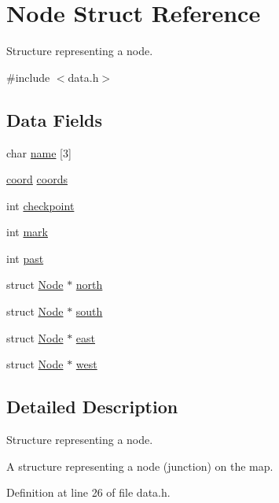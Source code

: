 \hypertarget{struct_node}{\section{Node Struct Reference}
\label{struct_node}
}


Structure representing a node.  




{\ttfamily \#include $<$data.\+h$>$}

\subsection*{Data Fields}
\begin{DoxyCompactItemize}
\item 
char \hyperlink{struct_node_ab4e4d331c9072f9a2fdc03f884ae954b}{name} \mbox{[}3\mbox{]}
\item 
\hyperlink{data_8h_a0159c7100fad61bcfb2d671d7602a458}{coord} \hyperlink{struct_node_a15d11412ba4f5fcc20d0e0eb6dc295f3}{coords}
\item 
int \hyperlink{struct_node_ad537ee1e0731b7e91067a1450ddb9ee6}{checkpoint}
\item 
int \hyperlink{struct_node_ade86011a84d36d228fd060457a570ad5}{mark}
\item 
int \hyperlink{struct_node_af41636b8efb982766af9f70e64354936}{past}
\item 
struct \hyperlink{struct_node}{Node} $\ast$ \hyperlink{struct_node_a5c53c4333e0171987ee7c9e81acfbf84}{north}
\item 
struct \hyperlink{struct_node}{Node} $\ast$ \hyperlink{struct_node_a8426d2b108235be14c915efa87150614}{south}
\item 
struct \hyperlink{struct_node}{Node} $\ast$ \hyperlink{struct_node_a4157043bf98cb4865d59f3a59cdf5a55}{east}
\item 
struct \hyperlink{struct_node}{Node} $\ast$ \hyperlink{struct_node_a9fd57a8641209ce5e3d0b93d63874f4c}{west}
\end{DoxyCompactItemize}


\subsection{Detailed Description}
Structure representing a node. 

A structure representing a node (junction) on the map. 

Definition at line 26 of file data.\+h.



